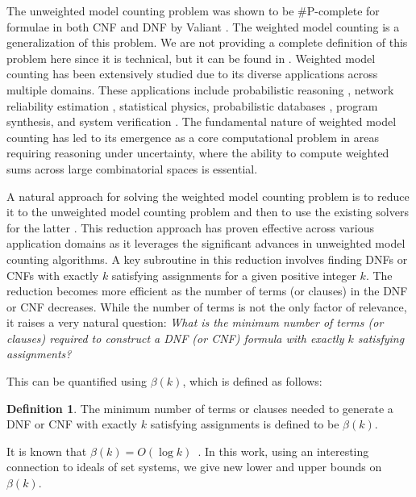 \documentclass[11pt,a4paper]{article}
\theoremstyle{definition}
\newtheorem{definition}[theorem]{Definition}
\begin{document}
The unweighted model counting problem was shown to be \#P-complete for 
formulae in both CNF and DNF by Valiant \cite{Valiant79}. The weighted 
model counting is a generalization of this problem. We are not 
providing a complete definition of this problem here since it is 
technical, but it can be found in \cite{Meel15}. Weighted model 
counting has been extensively studied \cite{ DBLP:journals/jair/DarwicheM02, DBLP:journals/siamcomp/FlumG04} due to its diverse applications 
across multiple domains. These applications include probabilistic 
reasoning \cite{Roth93}, network reliability estimation 
\cite{SangBBKP04}, statistical physics, probabilistic databases 
\cite{olteanu_probabilistic_2011}, program synthesis, and system verification 
\cite{DomshlakH07, XueCD12}. The fundamental nature of weighted model 
counting has led to its emergence as a core computational problem in 
areas requiring reasoning under uncertainty, where the ability to 
compute weighted sums across large combinatorial spaces is essential.

A natural approach for solving the weighted model counting problem is 
to reduce it to the unweighted model counting problem and then to use 
the existing solvers for the latter \cite{Meel15}. This reduction 
approach has proven effective across various application domains as it 
leverages the significant advances in unweighted model counting 
algorithms. A key subroutine in this reduction involves finding DNFs or 
CNFs with exactly $k$ satisfying assignments for a given positive 
integer $k$. The reduction becomes more efficient as the number of 
terms (or clauses) in the DNF or CNF decreases. {While the number of terms is not the only factor of relevance, it raises a very natural question: {\em What is 
	the minimum number of terms (or clauses) required to construct a DNF 
	(or CNF) formula with exactly $k$ satisfying assignments?}}

This can be quantified using $\beta(k)$, which is defined as follows:

\begin{definition}
	The minimum number of terms or clauses needed to generate a DNF or CNF 
	with exactly $k$ satisfying assignments is defined to be $\beta(k)$.
\end{definition}

{It is known that $\beta(k) = O(\log{k})$~\cite{Meel15}}. In this work, using an interesting connection to ideals of set 
systems, we give new lower and upper bounds on $\beta(k)$.
\end{document}
